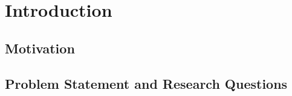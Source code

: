 \chapter{Introduction}
\label{ch:intro}

\section{Motivation}
\label{sec:intro-motivation}

\section{Problem Statement and Research Questions}
\label{sec:intro-rqs}

